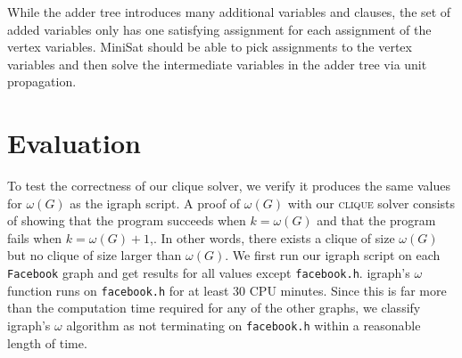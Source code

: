 \documentclass[]{article}
\newcommand{\clique}{\textsc{clique}}
\begin{document}
	While the adder tree introduces many additional variables and clauses, the set of added variables only has one satisfying assignment for each assignment of the vertex variables. MiniSat should be able to pick assignments to the vertex variables and then solve the intermediate variables in the adder tree via unit propagation\cite{matesoos}.

	\section{Evaluation}
	
	To test the correctness of our clique solver, we verify it produces the same values for $\omega(G)$ as the igraph script. A proof of $\omega(G)$ with our \clique{} solver consists of showing that the program succeeds when $k = \omega(G)$ and that the program fails when $k = \omega(G) + 1$,. In other words, there exists a clique of size $\omega(G)$ but no clique of size larger than $\omega(G)$. We first run our igraph script on each \texttt{Facebook} graph and get results for all values except \texttt{facebook.h}. igraph's $\omega$ function runs on \texttt{facebook.h} for at least 30 CPU minutes. Since this is far more than the computation time required for any of the other graphs, we classify igraph's $\omega$ algorithm as not terminating on \texttt{facebook.h} within a reasonable length of time.
	
\end{document}
